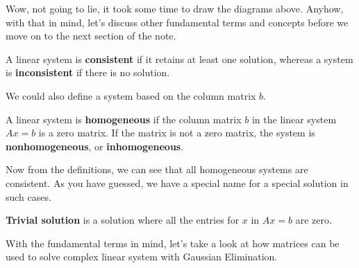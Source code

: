 \documentclass[../../main.tex]{subfiles}
\begin{document}
\begin{minipage}{0.48\textwidth}
\end{minipage}

Wow, not going to lie, it took some time to draw the diagrams above.
Anyhow, with that in mind, let's discuss other fundamental terms
and concepts before we move on to the next section of the note.

\begin{definition}{}{}
A linear system is \textbf{consistent} if it retains at least one
solution, whereas a system is \textbf{inconsistent} if there is no
solution.
\end{definition}

We could also define a system based on the column matrix $b$.

\begin{definition}{}{}
A linear system is \textbf{homogeneous} if the column matrix $b$
in the linear system $Ax = b$ is a zero matrix. If the matrix is not
a zero matrix, the system is \textbf{nonhomogeneous}, or
\textbf{inhomogeneous}.
\end{definition}

Now from the definitions, we can see that all homogeneous systems
are consistent. As you have guessed, we have a special name for
a special solution in such cases.

\begin{definition}{}{}
\textbf{Trivial solution} is a solution where all the entries for
$x$ in $Ax = b$ are zero.
\end{definition}

With the fundamental terms in mind, let's take a look at how matrices
can be used to solve complex linear system with Gaussian Elimination.
\end{document}

